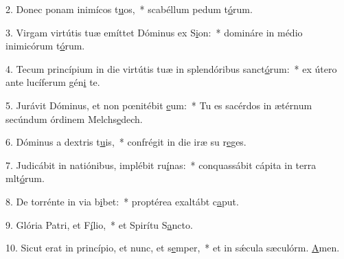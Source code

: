 2. Donec ponam inimícos t\uline{u}os,~* scabéllum pedum t\uline{ó}rum.\par 
3. Virgam virtútis tuæ emíttet Dóminus ex S\uline{i}on:~* domináre in médio inimicórum t\uline{ó}rum.\par 
4. Tecum princípium in die virtútis tuæ in splendóribus sanct\uline{ó}rum:~* ex útero ante lucíferum gén\uline{i} te.\par 
5. Jurávit Dóminus, et non pœnitébit \uline{e}um:~* Tu es sacérdos in ætérnum secúndum órdinem Melchs\uline{e}dech.\par 
6. Dóminus a dextris t\uline{u}is,~* confrégit in die iræ su r\uline{e}ges.\par 
7. Judicábit in natiónibus, implébit ru\uline{í}nas:~* conquassábit cápita in terra mlt\uline{ó}rum.\par 
8. De torrénte in via b\uline{i}bet:~* proptérea exaltábt c\uline{a}put.\par 
9. Glória Patri, et F\uline{í}lio,~* et Spirítu S\uline{a}ncto.\par 
10. Sicut erat in princípio, et nunc, et s\uline{e}mper,~* et in sǽcula sæculórm. \uline{A}men.\par 
